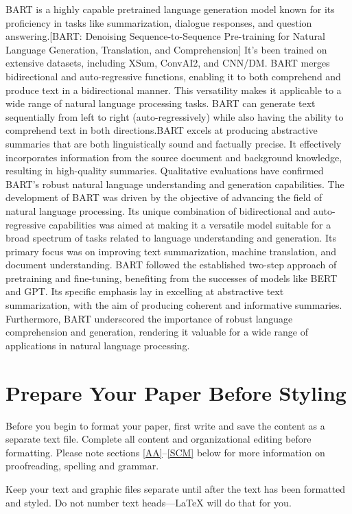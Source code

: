 \documentclass[conference]{IEEEtran}
\begin{document}
BART is a highly capable pretrained language generation model known for its proficiency in tasks like summarization, dialogue responses, and question answering.[BART: Denoising Sequence-to-Sequence Pre-training for Natural Language Generation, Translation, and Comprehension] It's been trained on extensive datasets, including XSum, ConvAI2, and CNN/DM. BART merges bidirectional and auto-regressive functions, enabling it to both comprehend and produce text in a bidirectional manner. This versatility makes it applicable to a wide range of natural language processing tasks. BART can generate text sequentially from left to right (auto-regressively) while also having the ability to comprehend text in both directions.BART excels at producing abstractive summaries that are both linguistically sound and factually precise. It effectively incorporates information from the source document and background knowledge, resulting in high-quality summaries. Qualitative evaluations have confirmed BART's robust natural language understanding and generation capabilities.
The development of BART was driven by the objective of advancing the field of natural language processing. Its unique combination of bidirectional and auto-regressive capabilities was aimed at making it a versatile model suitable for a broad spectrum of tasks related to language understanding and generation. Its primary focus was on improving text summarization, machine translation, and document understanding. BART followed the established two-step approach of pretraining and fine-tuning, benefiting from the successes of models like BERT and GPT. Its specific emphasis lay in excelling at abstractive text summarization, with the aim of producing coherent and informative summaries. Furthermore, BART underscored the importance of robust language comprehension and generation, rendering it valuable for a wide range of applications in natural language processing.


\section{Prepare Your Paper Before Styling}
Before you begin to format your paper, first write and save the content as a 
separate text file. Complete all content and organizational editing before 
formatting. Please note sections \ref{AA}--\ref{SCM} below for more information on 
proofreading, spelling and grammar.

Keep your text and graphic files separate until after the text has been 
formatted and styled. Do not number text heads---{\LaTeX} will do that 
for you.
\end{document}
